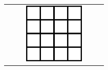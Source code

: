 							
							
							
							
							\vspace{5mm}
							\begin{table}[H]
								\small
								\vspace{-10pt}
								\setlength{\tabcolsep}{1pt} {
									\vspace{-5pt}
									\begin{center}
										\begin{minipage}{0.4\textwidth}
											\begin{figure}[H]
												\centering
												\begin{tabular}{c}
													\includegraphics[width=0.6\textwidth]{./pics/quadMesh}
												\end{tabular}
											\end{figure}
										\end{minipage}
										\begin{minipage}{0.5\textwidth}
											\begin{tabular}{c|c|c|c|c}

\end{tabular}
\end{minipage}
\end{center}}
\end{table}
